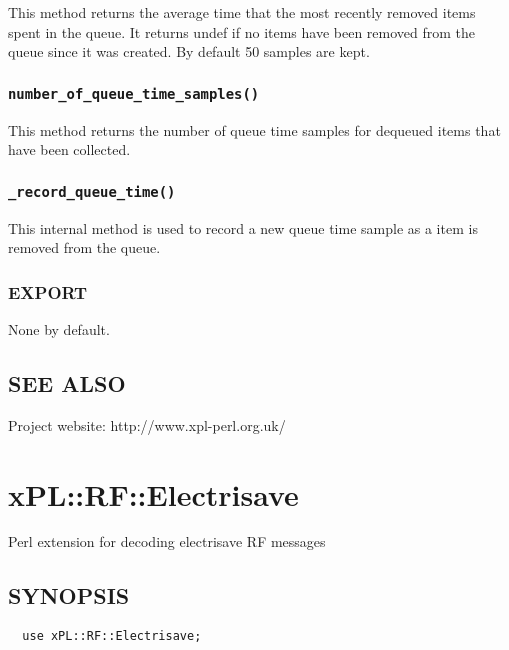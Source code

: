 \documentclass[12pt,a4paper]{article}
\begin{document}
This method returns the average time that the most recently removed
items spent in the queue.  It returns undef if no items have been
removed from the queue since it was created.  By default 50 samples
are kept.

\subsubsection*{\texttt{number\_of\_queue\_time\_samples()}\label{xPL::Queue_number_of_queue_time_samples_}}


This method returns the number of queue time samples for dequeued
items that have been collected.

\subsubsection*{\texttt{\_record\_queue\_time()}\label{xPL::Queue__record_queue_time_}}


This internal method is used to record a new queue time sample as a
item is removed from the queue.

\subsubsection*{EXPORT\label{xPL::Queue_EXPORT}}


None by default.

\subsection*{SEE ALSO\label{xPL::Queue_SEE_ALSO}}


Project website: http://www.xpl-perl.org.uk/

\newpage
\section{xPL::RF::Electrisave\label{xPL::RF::Electrisave}}


Perl extension for decoding electrisave RF messages

\subsection*{SYNOPSIS\label{xPL::RF::Electrisave_SYNOPSIS}}
\begin{verbatim}
  use xPL::RF::Electrisave;
\end{verbatim}
\end{document}

